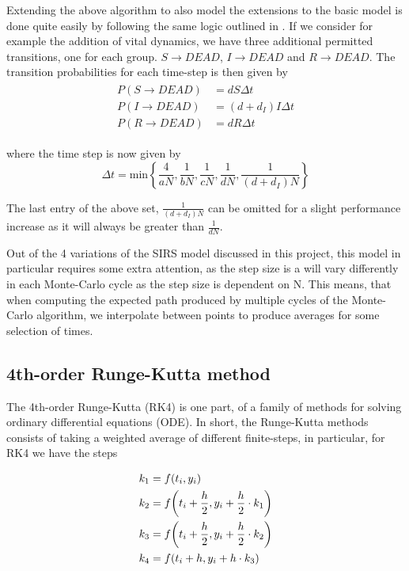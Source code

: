 \documentclass[10pt,showpacs,preprintnumbers,amsmath,amssymb,nofootinbib,aps,prl,twocolumn,groupedaddress,superscriptaddress,showkeys]{revtex4-1}
\begin{document}
  Extending the above algorithm to also model the extensions to the basic model is done quite easily by following the same logic outlined in \textcite{project5}. If we consider for example the addition of vital dynamics, we have three additional permitted transitions, one for each group. $S\rightarrow DEAD$, $I\rightarrow DEAD$ and $R \rightarrow DEAD$. The transition probabilities for each time-step is then given by
  \begin{align}
    \begin{split}
      P(S\rightarrow DEAD) &= dS \Delta t \\
      P(I\rightarrow DEAD) &= (d + d_I)I\Delta t \\ 
      P(R\rightarrow DEAD) &= dR\Delta t
    \end{split}
  \end{align}

  where the time step is now given by
  \begin{equation}
      \Delta t = \text{min}\left\{ \frac{4}{aN}, \frac{1}{bN}, \frac{1}{cN}, \frac{1}{dN}, \frac{1}{(d + d_I)N} \right\}
  \end{equation}

  The last entry of the above set, $\frac{1}{(d+d_I)N}$ can be omitted for a slight performance increase as it will always be greater than $\frac{1}{dN}$.

  Out of the 4 variations of the SIRS model discussed in this project, this model in particular requires some extra attention, as the step size is a will vary differently in each Monte-Carlo cycle as the step size is dependent on N. This means, that when computing the expected path produced by multiple cycles of the Monte-Carlo algorithm, we interpolate between points to produce averages for some selection of times.


  \subsection{4th-order Runge-Kutta method}
    The 4th-order Runge-Kutta (RK4) is one part, of a family of methods for solving ordinary differential equations (ODE). In short, the Runge-Kutta methods consists of taking a weighted average of different finite-steps, in particular, for RK4 we have the steps

    \begin{align}
      \begin{split}
        \centering           
        k_1 &= f(t_i, y_i) \\
        k_2 &= f \qty(t_i + \frac{h}{2}, y_i + \frac{h}{2} \cdot k_1) \\
        k_3 &= f \qty(t_i + \frac{h}{2}, y_i + \frac{h}{2} \cdot k_2) \\
        k_4 &= f \qty(t_i + h, y_i + h\cdot k_3)
      \end{split}         
    \end{align}
\end{document}
